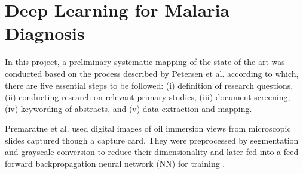 \section{Deep Learning for Malaria Diagnosis}

In this project, a preliminary systematic mapping of the state of the art was conducted based on the process described by Petersen et al. according to which, there are five essential steps to be followed: (i) definition of research questions, (ii) conducting research on relevant primary studies, (iii) document screening, (iv) keywording of abstracts, and (v) data extraction and mapping.




Premaratne et al. used digital images of oil immersion views from microscopic slides captured though a capture card. They were preprocessed by segmentation and grayscale conversion to reduce their dimensionality and later fed into a feed forward backpropagation neural network (NN) for training \cite{Premaratne2006AFilms}.